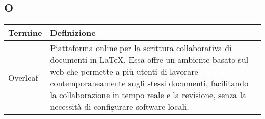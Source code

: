\documentclass[10pt]{article}
\begin{document}
\subsection{O} %
\begin{longtable}{|>{\centering\arraybackslash}m{2.5cm}|>{\arraybackslash}m{12.5cm}|}
\hline
\rowcolor[gray]{0.8}
\textbf{Termine} & \textbf{Definizione}\\
\endhead
\hline
Overleaf & Piattaforma online per la scrittura collaborativa di documenti in \LaTeX. Essa offre un ambiente basato sul web che permette a più utenti di lavorare contemporaneamente sugli stessi documenti, facilitando la collaborazione in tempo reale e la revisione, senza la necessità di configurare software locali.\\
\hline
\end{longtable}
\end{document}
